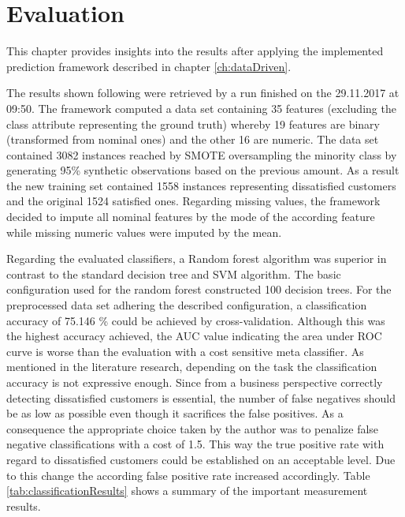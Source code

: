 \chapter{Evaluation}
\label{ch:evaluation}

This chapter provides insights into the results after applying the implemented prediction framework described in chapter \ref{ch:dataDriven}. 

The results shown following were retrieved by a run finished on the 29.11.2017 at 09:50. The framework computed a data set containing 35 features (excluding the class attribute representing the ground truth) whereby 19 features are binary (transformed from nominal ones) and the other 16 are numeric. The data set contained 3082 instances reached by SMOTE oversampling the minority class by generating 95\% synthetic observations based on the previous amount. As a result the new training set contained 1558 instances representing dissatisfied customers and the original 1524 satisfied ones. Regarding missing values, the framework decided to impute all nominal features by the mode of the according feature while missing numeric values were imputed by the mean. 	

Regarding the evaluated classifiers, a Random forest algorithm was superior in contrast to the standard decision tree and SVM algorithm. The basic configuration used for the random forest constructed 100 decision trees. For the preprocessed data set adhering the described configuration, a classification accuracy of 75.146 \% could be achieved by cross-validation. Although this was the highest accuracy achieved, the AUC value indicating the area under ROC curve is worse than the evaluation with a cost sensitive meta classifier. As mentioned in the literature research, depending on the task the classification accuracy is not expressive enough. Since from a business perspective correctly detecting dissatisfied customers is essential, the number of false negatives should be as low as possible even though it sacrifices the false positives. As a consequence the appropriate choice taken by the author was to penalize false negative classifications with a cost of 1.5. This way the true positive rate with regard to dissatisfied customers could be established on an acceptable level. Due to this change the according false positive rate increased accordingly. Table \ref{tab:classificationResults} shows a summary of the important measurement results.

